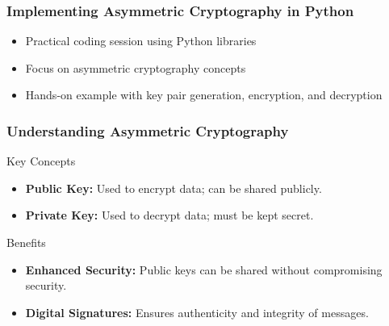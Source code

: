 \documentclass{beamer}
\begin{document}
\begin{frame}
    \frametitle{Implementing Asymmetric Cryptography in Python}
    \begin{itemize}
        \item Practical coding session using Python libraries
        \item Focus on asymmetric cryptography concepts
        \item Hands-on example with key pair generation, encryption, and decryption
    \end{itemize}
\end{frame}

\begin{frame}
    \frametitle{Understanding Asymmetric Cryptography}
    \begin{block}{Key Concepts}
        \begin{itemize}
            \item \textbf{Public Key:} Used to encrypt data; can be shared publicly.
            \item \textbf{Private Key:} Used to decrypt data; must be kept secret.
        \end{itemize}
    \end{block}
    
    \begin{block}{Benefits}
        \begin{itemize}
            \item \textbf{Enhanced Security:} Public keys can be shared without compromising security.
            \item \textbf{Digital Signatures:} Ensures authenticity and integrity of messages.
        \end{itemize}
    \end{block}
\end{frame}
\end{document}
